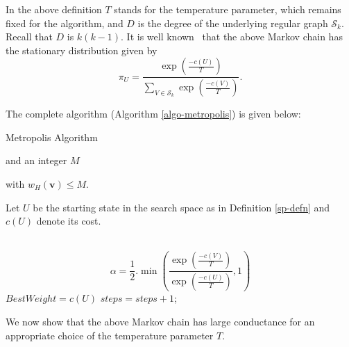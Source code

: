 \documentclass{sig-alternate-2013}
\begin{document}
In the above definition $T$ stands for the temperature parameter,
which remains fixed for the algorithm, and $D$ is the degree of the
underlying regular graph $\mathcal{S}_k$. Recall that $D$ is
$k(k-1)$.  It is well known~\cite[Chapter:
10.4.1]{citation-for-metropolis} that the above Markov chain has the
stationary distribution given by
\[
\pi_U = \frac{\exp\left({\frac{-c(U)}{T}}\right)}{\sum_{V \in \mathcal{S}_k}
  \exp\left({\frac{-c(V)}{T}}\right)}.
\]


The complete algorithm (Algorithm \ref{algo-metropolis}) is given below:

 \begin{algorithm} 

   \caption{Metropolis Algorithm}  \label{algo-metropolis}
 \begin{algorithmic}[1]

   \STATE {} and an integer $M$

   \STATE {} with
   $w_{H}(\mathbf{v}) \leq M $.

 Let $U$ be the starting state in the search space as in Definition \ref{sp-defn}
 and $c(U)$ denote its cost.
 \STATE {}
 \STATE {} \\
  \\

 \STATE {} \[\alpha = \frac{1}{2}.\min\left( \frac{\exp\left(\frac{-c(V)}{T}\right)}{\exp\left(\frac{-c(U)}{T}\right)} , 1\right)\]
 \STATE $BestWeight =c(U)$
 \ENDIF 
 \STATE $steps=steps+1$;
 \ENDWHILE	
 \end{algorithmic}
 \end{algorithm} 

We now show that the above Markov chain has large conductance for an
appropriate choice of the temperature parameter $T$.
\end{document}
